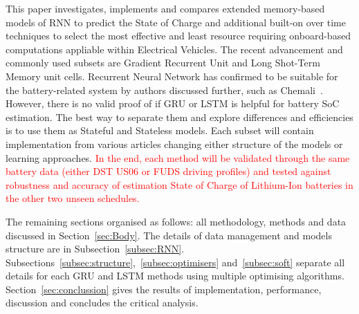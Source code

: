 %
%
This paper investigates, implements and compares extended memory-based models of RNN to predict the State of Charge and additional built-on over time techniques to select the most effective and least resource requiring onboard-based computations appliable within Electrical Vehicles.
The recent advancement and commonly used subsets are Gradient Recurrent Unit and Long Shot-Term Memory unit cells.
Recurrent Neural Network has confirmed to be suitable for the battery-related system by authors discussed further, such as Chemali~\cite{LSTM_Hochreiter1997}.
However, there is no valid proof of if GRU or LSTM is helpful for battery SoC estimation.
The best way to separate them and explore differences and efficiencies is to use them as Stateful and Stateless models.
Each subset will contain implementation from various articles changing either structure of the models or learning approaches.
\textcolor{red}{In the end, each method will be validated through the same battery data (either DST US06 or FUDS driving profiles) and tested against robustness and accuracy of estimation State of Charge of Lithium-Ion batteries in the other two unseen schedules.}

%
%
The remaining sections organised as follows: all methodology, methods and data discussed in Section~\ref{sec:Body}.
The details of data management and models structure are in Subsection~\ref{subsec:RNN}.
Subsections~\ref{subsec:structure},~\ref{subsec:optimisers} and~\ref{subsec:soft} separate all details for each GRU and LSTM methods using multiple optimising algorithms.
Section~\ref{sec:conclussion} gives the results of implementation, performance, discussion and concludes the critical analysis.